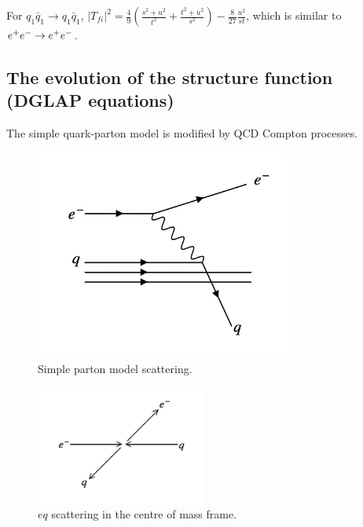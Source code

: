For $q_1 \bar{q}_1 \to q_1 \bar{q}_1$, $|T_{fi}|^2 = \frac{4}{9}\left(\frac{s^2 + u^2}{t^2} + \frac{t^2 + u^2}{s^2}\right) - \frac{8}{27}\frac{u^2}{st}$, which is similar to $e^+e^- \to e^+e^-$.

\subsection{The evolution of the structure function (DGLAP equations)}

The simple quark-parton model is modified by QCD Compton processes.

\begin{figure}[!htb]
  \begin{center}
    \includegraphics[width=0.75\textwidth]{images/web_feynman/image_67.png}
    \caption[Simple parton model scattering]{Simple parton model scattering.}
    \label{fig:ch14_simplePartonDIS}
  \end{center}
\end{figure}

\begin{figure}[!htb]
  \begin{center}
    \includegraphics[width=0.5\textwidth]{images/web_feynman/image_68.png}
    \caption[$eq$ scattering in the centre of mass frame]{$eq$ scattering in the centre of mass frame.}
    \label{fig:ch14_simplePartonDISCM}
  \end{center}
\end{figure}

